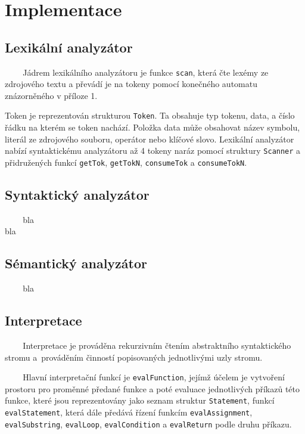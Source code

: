 \documentclass[12pt,a4paper,titlepage,final]{article}
\begin{document}
\section{Implementace} \label{implementace}
\subsection{Lexikální analyzátor}
~ ~ ~Jádrem lexikálního analyzátoru je funkce \texttt{scan}, která čte lexémy ze zdrojového 
textu a převádí je na tokeny pomocí konečného automatu znázorněného v příloze 1.

Token je reprezentován strukturou \texttt{Token}. Ta obsahuje typ tokenu, data, a číslo 
řádku na kterém se token nachází. Položka data může obsahovat název symbolu, literál ze 
zdrojového souboru, operátor nebo klíčové slovo. Lexikální analyzátor nabízí syntaktickému 
analyzátoru až 4 tokeny naráz pomocí struktury \texttt{Scanner} a přidružených funkcí
\texttt{getTok}, \texttt{getTokN}, \texttt{consumeTok} a \texttt{consumeTokN}.
\subsection{Syntaktický analyzátor}
~ ~ ~bla\\ bla
\subsection{Sémantický analyzátor}
~ ~ ~bla
\subsection{Interpretace}
~ ~ ~Interpretace je prováděna rekurzivním čtením abstraktního syntaktického stromu
a~prováděním činností popisovaných jednotlivými uzly stromu. 

~ ~ ~Hlavní interpretační funkcí je \texttt{evalFunction}, jejímž účelem je 
vytvoření prostoru pro proměnné předané funkce a poté evaluace jednotlivých
příkazů této funkce, které jsou reprezentovány jako seznam struktur \texttt{Statement},
funkcí \texttt{evalStatement}, která dále předává řízení funkcím
\texttt{evalAssignment}, \texttt{evalSubstring}, \texttt{evalLoop}, 
\texttt{evalCondition} a \texttt{evalReturn} podle druhu příkazu.
\end{document}
